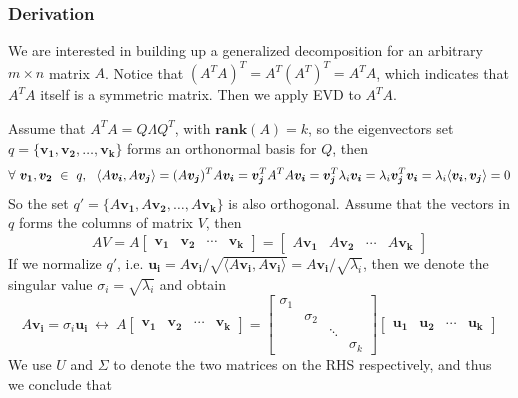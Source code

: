 \documentclass[11pt]{article}
\begin{document}
\subsubsection{Derivation}
We are interested in building up a generalized decomposition for an arbitrary $m \times n $ matrix $A$. Notice that $(A^TA)^T = A^T (A^T)^T = A^TA$, which indicates that $A^TA$ itself is a symmetric matrix. Then we apply EVD to $A^TA$.  \par 
Assume that $A^TA = Q \Lambda Q^{T}$, with $\bm{rank}(A) = k$, so the eigenvectors set $q = \{\bm{v_1}, \bm{v_2}, \dots, \bm{v_k} \}$ forms an orthonormal basis for $Q$, then 
\begin{equation}
    \forall~\bm{v_1}, \bm{v_2}~\in~q, ~~\langle A\bm{v_i} , A\bm{v_j} \rangle = (A\bm{v_j})^T A\bm{v_i} = \bm{v_j}^T A^T A \bm{v_i} = \bm{v_j}^T \lambda_i \bm{v_i} = \lambda_i \bm{v_j}^T \bm{v_i} = \lambda_i \langle \bm{v_i}, \bm{v_j} \rangle = 0 \notag
\end{equation}  
So the set $q' = \{ A\bm{v_1}, A\bm{v_2}, \dots, A\bm{v_k} \}$ is also orthogonal. Assume that the vectors in $q$ forms the columns of matrix $V$, then
\begin{equation}
    AV = A\begin{bmatrix} \bm{v_1} & \bm{v_2} & \cdots & \bm{v_k} \end{bmatrix}
    = \begin{bmatrix} A\bm{v_1} & A\bm{v_2} & \cdots & A\bm{v_k} \end{bmatrix}
\end{equation}
If we normalize $q'$,  i.e. $\bm{u_i} = A\bm{v_i} / \sqrt{\langle A\bm{v_i}, A\bm{v_i} \rangle}  = A\bm{v_i} / \sqrt{\lambda_i}$, then we denote the singular value $\sigma_i = \sqrt{\lambda_i}$ and obtain
\begin{equation}
    A\bm{v_i} = \sigma_i \bm{u_i}~\leftrightarrow~A\begin{bmatrix} \bm{v_1} & \bm{v_2} & \cdots & \bm{v_k} \end{bmatrix} = \begin{bmatrix} \sigma_1 & & & \\
        & \sigma_2 & & \\ & & \ddots & \\ &&& \sigma_k \end{bmatrix} \begin{bmatrix}
    \bm{u_1} & \bm{u_2} & \cdots & \bm{u_k} \end{bmatrix} 
\end{equation}
We use $U$ and $\Sigma$ to denote the two matrices on the RHS respectively, and thus we conclude that
\end{document}

